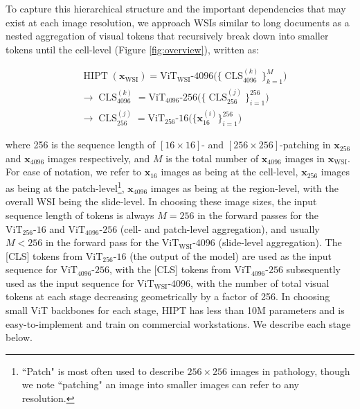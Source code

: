 {To capture this hierarchical structure and the important dependencies that may exist at each image resolution, we approach WSIs similar to long documents as a nested aggregation of visual tokens that recursively break down into smaller tokens until the cell-level (Figure \ref{fig:overview}), written as:

\begin{align*}
    & \operatorname{HIPT}(\mathbf{x}_{\text{WSI}}) = \operatorname{ViT_{WSI}\textrm{-}4096}\big(\big\{ \operatorname{CLS}_{4096}^{(k)} \big\}_{k=1}^{M}\big) \\
    &\rightarrow \operatorname{CLS}_{4096}^{(k)} = \operatorname{ViT_{4096}\textrm{-}256} \big( \{ \operatorname{CLS}_{256}^{(j)} \}_{i=1}^{256} \big) \\
    &\rightarrow \operatorname{CLS}_{256}^{(j)} = \operatorname{ViT_{256}\textrm{-}16} \big( \{ \textbf{x}_{16}^{(i)} \}_{i=1}^{256} \big)
\end{align*}

 where 256 is the sequence length of $[16 \times 16]$- and $[256 \times 256]$-patching in $\textbf{x}_{256}$ and $\textbf{x}_{4096}$ images respectively, and $M$ is the total number of $\textbf{x}_{4096}$ images in $\textbf{x}_{\text{WSI}}$. For ease of notation, we refer to $\textbf{x}_{16}$ images as being at the cell-level, $\textbf{x}_{256}$ images as being at the patch-level\footnote{``Patch" is most often used to describe $256 \times 256$ images in pathology, though we note ``patching" an image into smaller images can refer to any resolution.}, $\textbf{x}_{4096}$ images as being at the region-level, with the overall WSI being the slide-level. In choosing these image sizes, the input sequence length of tokens is always $M=256$ in the forward passes for the $\operatorname{ViT_{256}\textrm{-}16}$ and $\operatorname{ViT_{4096}\textrm{-}256}$ (cell- and patch-level aggregation), and usually $M < 256$ in the forward pass for the $\operatorname{ViT_\text{WSI}\textrm{-}4096}$ (slide-level aggregation). The [CLS] tokens from $\operatorname{ViT_{256}\textrm{-}16}$ (the output of the model) are used as the input sequence for $\operatorname{ViT_{4096}\textrm{-}256}$, with the [CLS] tokens from $\operatorname{ViT_{4096}\textrm{-}256}$ subsequently used as the input sequence for $\operatorname{ViT_\text{WSI}\textrm{-}4096}$, with the number of total visual tokens at each stage decreasing geometrically by a factor of 256. In choosing small ViT backbones for each stage, HIPT has less than 10M parameters and is easy-to-implement and train on commercial workstations. We describe each stage below.

}
